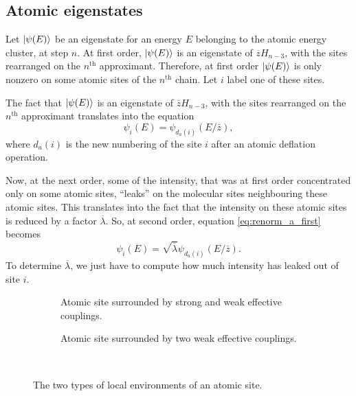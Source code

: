 \documentclass[aps,prl,preprint]{revtex4-1}
\newcommand{\lb}{\ensuremath{\overline{\lambda}}}
\newcommand{\zb}{\ensuremath{\overline{z}}}
\begin{document}
\subsection{Atomic eigenstates}

Let $\ket{\psi(E)}$ be an eigenstate for an energy $E$ belonging to the atomic energy cluster, at step $n$.
At first order, $\ket{\psi(E)}$ is an eigenstate of $\zb H_{n-3}$, with the sites rearranged on the $n^\text{th}$ approximant.
Therefore, at first order $\ket{\psi(E)}$ is only nonzero on some atomic sites of the $n^\text{th}$ chain. Let $i$ label one of these sites.

The fact that $\ket{\psi(E)}$ is an eigenstate of $\zb H_{n-3}$, with the sites rearranged on the $n^\text{th}$ approximant translates into the equation
\begin{equation}
\label{eq:renorm_a_first}
	\psi_i(E) = \psi_{d_a(i)}(E/\bar z),
\end{equation}
where $d_a(i)$ is the new numbering of the site $i$ after an atomic deflation operation.

Now, at the next order, some of the intensity, that was at first order concentrated only on some atomic sites, ``leaks'' on the molecular sites neighbouring these atomic sites. 
This translates into the fact that the intensity on these atomic sites is reduced by a factor $\lb$.
So, at second order, equation \eqref{eq:renorm_a_first} becomes
\begin{equation}
\label{eq:renorm_a}
	\psi_i(E) = \sqrt{\lb} \psi_{d_a(i)}(E/\bar z).
\end{equation}
To determine $\lb$, we just have to compute how much intensity has leaked out of site $i$.

\begin{figure}[htp]

\centering
\begin{subfigure}{.5\textwidth}
  \centering
  
  \caption{Atomic site surrounded by strong and weak effective couplings.}
  \label{fig:atom1}
\end{subfigure}%
\begin{subfigure}{.5\textwidth}
  \centering
  
  \caption{Atomic site surrounded by two weak effective couplings.}
  \label{fig:atom2}
\end{subfigure} \\

\caption{The two types of local environments of an atomic site. }
\label{fig:energyconf1}
\end{figure}
\end{document}
